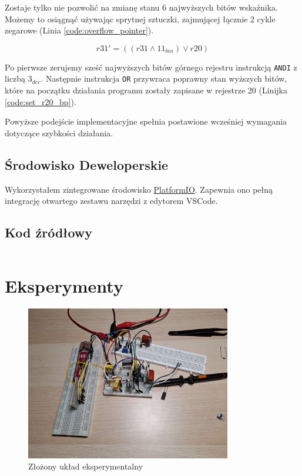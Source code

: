 \documentclass[12pt, a4paper]{article}
\begin{document}
Zostaje tylko nie  pozwolić na zmianę stanu 6 najwyższych bitów wskaźnika.
Możemy to osiągnąć używając sprytnej sztuczki, zajmującej łącznie 2 cykle zegarowe (Linia \ref{code:overflow_pointer}).

\begin{equation}
	r31' = \left( \left( r31 \land 11_{bin} \right) \lor r20 \right)
\end{equation}

Po pierwsze zerujemy sześć najwyższych bitów górnego rejestru instrukcją \verb|ANDI| z liczbą $3_{dec}$.
Następnie instrukcja \verb|OR| przywraca poprawny stan wyższych bitów, 
które na początku działania programu zostały zapisane w rejestrze 20 (Linijka \ref{code:set_r20_bp}).

Powyższe podejście implementacyjne spełnia postawione wcześniej wymagania dotyczące szybkości działania.


\subsection{Środowisko Deweloperskie}
Wykorzystałem zintegrowane środowisko \href{https://platformio.org/}{PlatformIO}.
Zapewnia ono pełną integrację otwartego zestawu narzędzi z edytorem VSCode.

\subsection{Kod źródłowy}

\inputminted[linenos=true,escapeinside=@@,fontfamily=phv]{asm}{../code/src/main.S}

\newpage

\section{Eksperymenty}
\begin{figure}[h]
	\centering
	\includegraphics[width=0.8\textwidth]{img/experimental_setup.jpg}
	\caption{Złożony układ eksperymentalny}
	
\end{figure}
\end{document}
